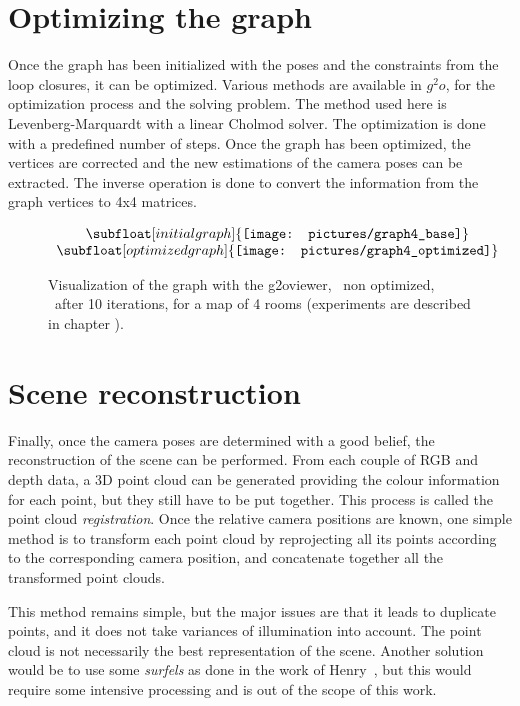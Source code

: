 \section{Optimizing the graph}

Once the graph has been initialized with the poses and the constraints from the loop closures, it can be optimized. Various methods are available in $g^2o$, for the optimization process and the solving problem. The method used here is Levenberg-Marquardt with a linear Cholmod solver. The optimization is done with a predefined number of steps. Once the graph has been optimized, the vertices are corrected and the new estimations of the camera poses can be extracted. The inverse operation is done to convert the information from the graph vertices to 4x4 matrices.

\begin{figure}[H]
\centering$
 \begin{array}{c}
 \subfloat[initial graph]{\label{fig:g2o_view_1}\texttt{[image: pictures/graph4\_base]}} \\
 \subfloat[optimized graph]{\label{fig:g2o_view_2}\texttt{[image: pictures/graph4\_optimized]}}
 \end{array}$
\caption{Visualization of the graph with the g2oviewer, ~non optimized, ~after 10 iterations, for a map of 4 rooms (experiments are described in chapter \protect{\ref{chap:experiments}}).}
\end{figure}
\clearpage

\section{Scene reconstruction}

Finally, once the camera poses are determined with a good belief, the reconstruction of the scene can be performed. From each couple of RGB and depth data, a 3D point cloud can be generated providing the colour information for each point, but they still have to be put together. This process is called the point cloud \emph{registration}. Once the relative camera positions are known, one simple method is to transform each point cloud by reprojecting all its points according to the corresponding camera position, and concatenate together all the transformed point clouds.

This method remains simple, but the major issues are that it leads to duplicate points, and it does not take variances of illumination into account. The point cloud is not necessarily the best representation of the scene. Another solution would be to use some \emph{surfels} as done in the work of Henry~\cite{Henry_RGBD_2010}, but this would require some intensive processing and is out of the scope of this work.

